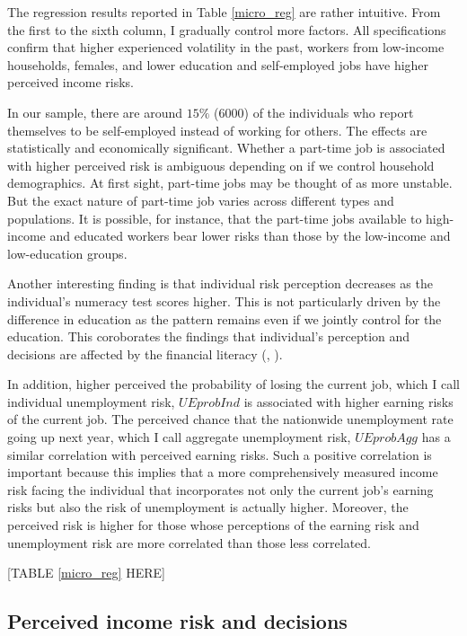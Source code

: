 \documentclass[12pt,notitlepage,onecolumn,aps,pra]{article}
\begin{document}
The regression results reported in Table \ref{micro_reg} are rather
intuitive. From the first to the sixth column, I gradually control more
factors. All specifications confirm that higher experienced volatility
in the past, workers from low-income households, females, and lower
education and self-employed jobs have higher perceived income risks.

In our sample, there are around \(15\%\) (6000) of the individuals who
report themselves to be self-employed instead of working for others. The
effects are statistically and economically significant. Whether a
part-time job is associated with higher perceived risk is ambiguous
depending on if we control household demographics. At first sight,
part-time jobs may be thought of as more unstable. But the exact nature
of part-time job varies across different types and populations. It is
possible, for instance, that the part-time jobs available to high-income
and educated workers bear lower risks than those by the low-income and
low-education groups.

Another interesting finding is that individual risk perception decreases
as the individual's numeracy test scores higher. This is not
particularly driven by the difference in education as the pattern
remains even if we jointly control for the education. This coroborates
the findings that individual's perception and decisions are affected by
the financial literacy (\cite{van2011financial},
\cite{lusardi2014economic}).

In addition, higher perceived the probability of losing the current job,
which I call individual unemployment risk, \(\textit{UEprobInd}\) is
associated with higher earning risks of the current job. The perceived
chance that the nationwide unemployment rate going up next year, which I
call aggregate unemployment risk, \(\textit{UEprobAgg}\) has a similar
correlation with perceived earning risks. Such a positive correlation is
important because this implies that a more comprehensively measured
income risk facing the individual that incorporates not only the current
job's earning risks but also the risk of unemployment is actually
higher. Moreover, the perceived risk is higher for those whose
perceptions of the earning risk and unemployment risk are more
correlated than those less correlated.

{[}TABLE \ref{micro_reg} HERE{]}



    \hypertarget{perceived-income-risk-and-decisions}{%
\subsection{Perceived income risk and
decisions}\label{perceived-income-risk-and-decisions}}
\end{document}
